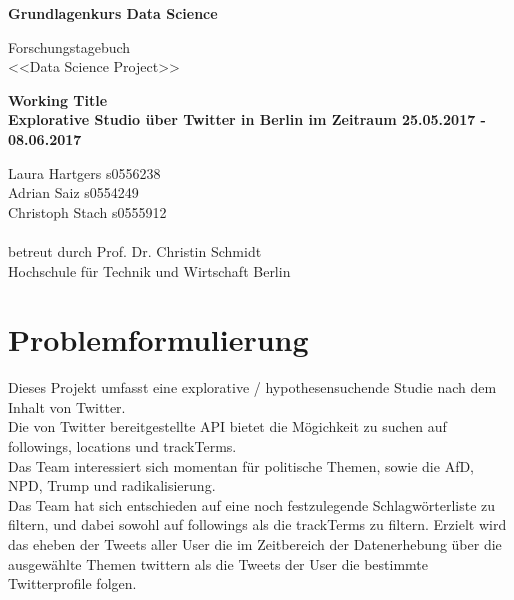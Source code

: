 \documentclass[12pt, 
	a4paper, 
	oneside, 
	leqno]{scrreprt}
\begin{document}
\begin{titlepage}
\begin{center}

\begin{Huge}

\textbf{Grundlagenkurs Data Science}
\newline\newline
\end{Huge}

\begin{LARGE}
Forschungstagebuch \\
<<Data Science Project>> \\
\end{LARGE}
\vfill
\textbf{Working Title \\ Explorative Studio über Twitter in Berlin im Zeitraum 25.05.2017 - 08.06.2017}

\end{center}
\vfill
Laura Hartgers s0556238 \\
Adrian Saiz s0554249 \\
Christoph Stach s0555912 \\
\\
betreut durch Prof. Dr. Christin Schmidt \\
Hochschule für Technik und Wirtschaft Berlin
\end{titlepage}

\setcounter{tocdepth}{2} %
\tableofcontents
\pagebreak

\chapter{Problemformulierung}

Dieses Projekt umfasst eine explorative / hypothesensuchende Studie nach dem Inhalt von Twitter.
\\
Die von Twitter bereitgestellte API bietet die Mögichkeit zu suchen auf followings, locations und trackTerms.
\\
Das Team interessiert sich momentan für politische Themen, sowie die AfD, NPD, Trump und radikalisierung. 
\\
Das Team hat sich entschieden auf eine noch festzulegende Schlagwörterliste zu filtern, und dabei sowohl auf followings als die trackTerms zu filtern. Erzielt wird das eheben der Tweets aller User die im Zeitbereich der Datenerhebung über die ausgewählte Themen twittern als die Tweets der User die bestimmte Twitterprofile folgen.
\end{document}
